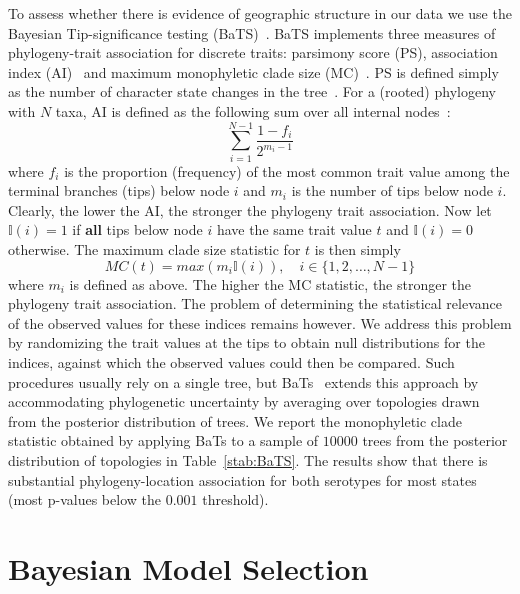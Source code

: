 \documentclass[a4paper,10pt]{article}
\begin{document}
To assess whether there is evidence of geographic structure in our data we use the Bayesian Tip-significance testing (BaTS)~\cite{M-bats}.
BaTS implements three measures of phylogeny-trait association for discrete traits: parsimony score (PS), association index (AI)~\cite{Wang2001} and maximum monophyletic clade size (MC)~\cite{Salemi2005}.
PS is defined simply as the number of character state changes in the tree~\cite{Fitch1971}.
For a (rooted) phylogeny with $N$ taxa, AI is defined as the following sum over all internal nodes~\cite{Wang2001}:
\begin{equation}
 \sum_{i=1}^{N-1}\frac{1-f_i}{2^{m_i - 1}}
\end{equation}
where $f_i$ is the proportion (frequency) of the most common trait value among the terminal branches (tips) below node $i$ and $m_i$ is the number of tips below node $i$.
Clearly, the lower the AI, the stronger the phylogeny trait association.
Now let $\mathbb{I}(i) = 1$ if \textbf{all} tips below node $i$ have the same trait value $t$ and $\mathbb{I}(i) = 0$ otherwise.
The maximum clade size statistic for $t$ is then simply~\cite{Salemi2005}
\begin{equation}
MC(t) = max(m_i\mathbb{I}(i)), \quad i \in \{1, 2, \ldots, N-1\} 
\end{equation}
where $m_i$ is defined as above.
The higher the MC statistic, the stronger the phylogeny trait association.
The problem of determining the statistical relevance of the observed values for these indices remains however.
We address this problem by randomizing the trait values at the tips to obtain null distributions for the indices, against which the observed values could then be compared.
Such procedures usually rely on a single tree, but BaTs~\cite{M-bats} extends this approach by accommodating phylogenetic uncertainty by averaging over topologies drawn from the posterior distribution of trees.
We report the monophyletic clade statistic obtained by applying BaTs to a sample of $10 000$ trees from the posterior distribution of topologies in Table~\ref{stab:BaTS}.
The results show that there is substantial phylogeny-location association for both serotypes for most states (most p-values below the $0.001$ threshold).

\section*{Bayesian Model Selection}
\end{document}
